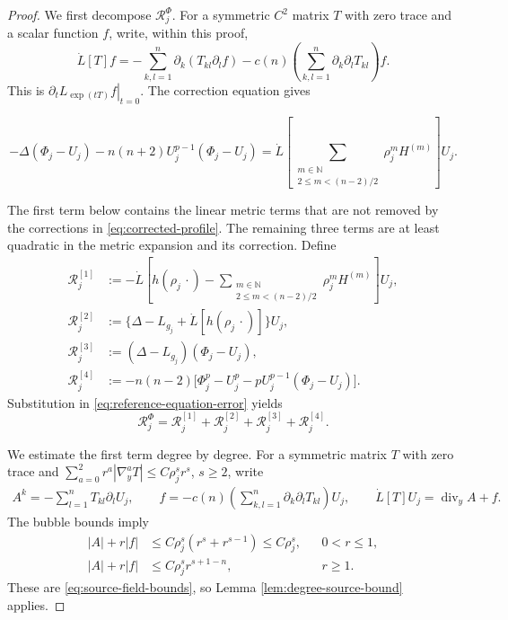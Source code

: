 \documentclass[11pt]{article}
\numberwithin{equation}{section}
\theoremstyle{remark}
\begin{document}
\begin{proof}
We first decompose \(\mathcal R_j^\Phi\).
For a symmetric \(C^2\) matrix \(T\) with zero trace and a scalar function \(f\),
write, within this proof,
\[
 \dot L[T]f
 =-\sum_{k,l=1}^n\partial_k(T_{kl}\partial_lf)
 -c(n)\left(\sum_{k,l=1}^n\partial_k\partial_lT_{kl}\right)f.
\]
This is \(\left.\partial_tL_{\exp(tT)}f\right|_{t=0}\).
The correction equation gives
 
\[
 -\Delta(\Phi_j-U_j)
 -n(n+2)U_j^{p-1}(\Phi_j-U_j)
 =\dot L\left[
 \sum_{\substack{m\in\mathbb N\\2\le m<(n-2)/2}}
 \rho_j^mH^{(m)}\right]U_j.
\]

The first term below contains the linear metric terms that are not removed
by the corrections in \eqref{eq:corrected-profile}. The remaining three
terms are at least quadratic in the metric expansion and its correction.
Define
\[
 \begin{aligned}
 \mathcal R_j^{[1]}
 &:=-\dot L\left[h(\rho_j\,\cdot)
 -\sum_{\substack{m\in\mathbb N\\2\le m<(n-2)/2}}
 \rho_j^mH^{(m)}\right]U_j,\\
 \mathcal R_j^{[2]}
 &:=\{\Delta-L_{g_j}+\dot L[h(\rho_j\,\cdot)]\}U_j,\\
 \mathcal R_j^{[3]}
 &:=(\Delta-L_{g_j})(\Phi_j-U_j),\\
 \mathcal R_j^{[4]}
 &:=-n(n-2)\bigl[\Phi_j^p-U_j^p-pU_j^{p-1}(\Phi_j-U_j)\bigr].
 \end{aligned}
\]
Substitution in \eqref{eq:reference-equation-error} yields
\[
 \mathcal R_j^\Phi
 =\mathcal R_j^{[1]}+\mathcal R_j^{[2]}
 +\mathcal R_j^{[3]}+\mathcal R_j^{[4]}.
\]

We estimate the first term degree by degree.
For a symmetric matrix \(T\) with zero trace and
\(\sum_{a=0}^2r^a|\nabla_y^aT|
\le C\rho_j^s r^s\), \(s\ge2\), write
\[
 \begin{gathered}
 A^k=-\sum_{l=1}^nT_{kl}\partial_lU_j,\qquad
 f=-c(n)\left(\sum_{k,l=1}^n\partial_k\partial_lT_{kl}\right)U_j,\qquad 
 \dot L[T]U_j=\operatorname{div}_y A+f.
 \end{gathered}
\]
The bubble bounds imply
\[
 \begin{aligned}
 |A|+r|f|&\le C\rho_j^s(r^s+r^{s-1})\le C\rho_j^s,
 &&0<r\le1,\\
 |A|+r|f|&\le C\rho_j^s r^{s+1-n},&&r\ge1.
 \end{aligned}
\]
These are \eqref{eq:source-field-bounds}, so
Lemma  \ref{lem:degree-source-bound} applies.


\end{proof}
\end{document}
